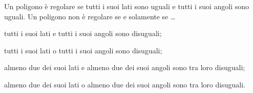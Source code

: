 \begin{esercizio}
\label{ese:1.134}
Un poligono è regolare se tutti i suoi lati sono uguali e tutti i suoi angoli sono uguali. Un poligono non è regolare se e solamente se \ldots
\begin{enumeratea}
\item tutti i suoi lati e tutti i suoi angoli sono disuguali;
\item tutti i suoi lati o tutti i suoi angoli sono disuguali;
\item almeno due dei suoi lati e almeno due dei suoi angoli sono tra loro disuguali;
\item almeno due dei suoi lati o almeno due dei suoi angoli sono tra loro disuguali.
\end{enumeratea}
\end{esercizio}


